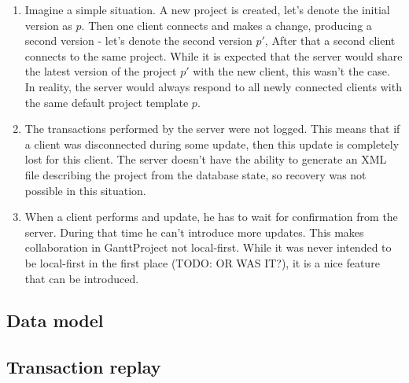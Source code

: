 \documentclass[a4paper, 11pt, oneside]{article}
\theoremstyle{definition}
\begin{document}
\begin{enumerate}
    \item Imagine a simple situation. A new project is created, let's denote the initial version as $p$. Then one client connects and makes a change, producing a second version - let's denote the second version $p'$, After that a second client connects to the same project. While it is expected that the server would share the latest version of the project $p'$ with the new client, this wasn't the case. In reality, the server would always respond to all newly connected clients with the same default project template $p$.
    \item The transactions performed by the server were not logged. This means that if a client was disconnected during some update, then this update is completely lost for this client. The server doesn't have the ability to generate an XML file describing the project from the database state, so recovery was not possible in this situation.
    \item When a client performs and update, he has to wait for confirmation from the server. During that time he can't introduce more updates. This makes collaboration in GanttProject not local-first. While it was never intended to be local-first in the first place (TODO: OR WAS IT?), it is a nice feature that can be introduced.
\end{enumerate}

\subsection{Data model}

\subsection{Transaction replay}

\newpage
\printbibliography
\clearpage
\end{document}
